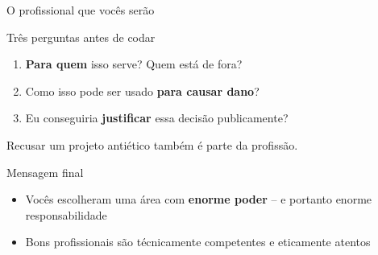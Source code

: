 \documentclass[aspectratio=169]{beamer}
\newcommand{\impt}[1]{\textcolor{maccent}{\textbf{#1}}}
\newcommand{\ntc}[1]{\textcolor{mprimary}{#1}}
\begin{document}
\begin{frame}{O profissional que voc\^es ser\~ao}
\begin{block}{Tr\^es perguntas antes de codar}
\begin{enumerate}
  \item \impt{Para quem} isso serve? Quem est\'a de fora?
  \item Como isso pode ser usado \impt{para causar dano}?
  \item Eu conseguiria \impt{justificar} essa decis\~ao publicamente?
\end{enumerate}
\end{block}
\pause
\vspace{0.3cm}
\ntc{Recusar} um projeto antiético tamb\'em \'e parte da profiss\~ao.
\end{frame}

\begin{frame}{Mensagem final}
\begin{itemize}
  \item Voc\^es escolheram uma \'area com \impt{enorme poder} -- e portanto enorme responsabilidade
  \pause
  \item Bons profissionais s\~ao t\'ecnicamente competentes \ntc{e} eticamente atentos
\end{itemize}
\end{frame}
\end{document}
